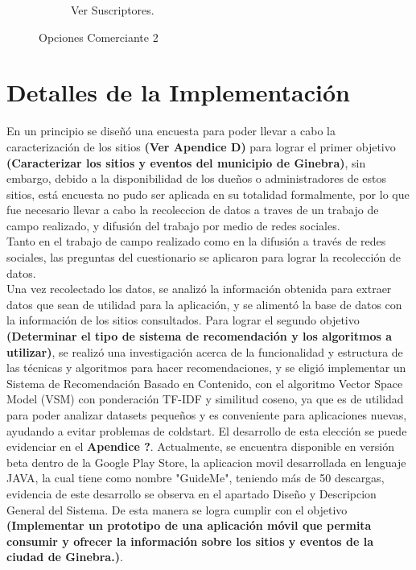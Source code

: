 \documentclass[12pt,letterpaper,openany]{book}
\begin{document}
\begin{figure}[H]
\begin{subfigure}{.4\linewidth}
        \caption{Ver Suscriptores.}
    \end{subfigure}
    \caption{Opciones Comerciante 2}
\end{figure}

\section{Detalles de la Implementación}
En un principio se diseñó una encuesta para poder llevar a cabo la caracterización de los sitios \textbf{(Ver Apendice D)} para lograr el primer objetivo \textbf{(Caracterizar los sitios y eventos del municipio de Ginebra)}, sin embargo, debido a la disponibilidad de los dueños o administradores de estos sitios, está encuesta no pudo ser aplicada en su totalidad formalmente, por lo que fue necesario llevar a cabo la recoleccion de datos a traves de un trabajo de campo realizado, y difusión del trabajo por medio de redes sociales.\\
Tanto en el trabajo de campo realizado como en la difusión a través de redes sociales, las preguntas del cuestionario se aplicaron para lograr la recolección de datos.\\
Una vez recolectado los datos, se analizó la información obtenida para extraer datos que sean de utilidad para la aplicación, y se alimentó la base de datos con la información de los sitios consultados.
\vspace{5mm}\newline
Para lograr el segundo objetivo \textbf{(Determinar el tipo de sistema de recomendación y los algoritmos a utilizar)}, se realizó una investigación acerca de la funcionalidad y estructura de las técnicas y algoritmos para hacer recomendaciones, y se eligió implementar un Sistema de Recomendación Basado en Contenido, con el algoritmo Vector Space Model (VSM) con ponderación TF-IDF y similitud coseno, ya que es de utilidad para poder analizar datasets pequeños y es conveniente para aplicaciones nuevas, ayudando a evitar problemas de coldstart. El desarrollo de esta elección se puede evidenciar en el \textbf{Apendice ?}.
\vspace{5mm}\newline
Actualmente, se encuentra disponible en versión beta dentro de la Google Play Store, la aplicacion movil desarrollada en lenguaje JAVA, la cual tiene como nombre "GuideMe",  teniendo más de 50 descargas, evidencia de este desarrollo se observa en el apartado Diseño y Descripcion General del Sistema. De esta manera se logra cumplir con el objetivo \textbf{(Implementar un prototipo de una aplicación móvil que permita consumir y ofrecer la información sobre los sitios y eventos de la ciudad de Ginebra.)}.
\end{document}
